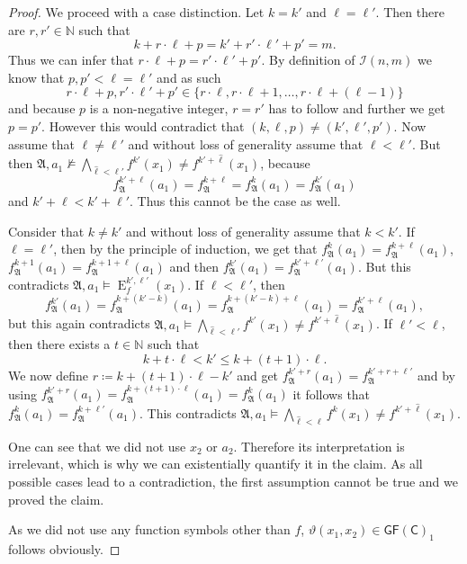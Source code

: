 \documentclass[a4paper,11pt,DIV=15]{scrartcl} %
\theoremstyle{plain}
\theoremstyle{definition}
\newcommand{\GFC}{\mathsf{GF}(\mathsf{C})}
\renewcommand{\theta}{\vartheta}
\begin{document}
\begin{proof}
	We proceed with a case distinction. 
	Let $k=k'$ and $\ell=\ell'$.
	Then there are $r,r'\in\mathbb N$ such that
	$$k+r\cdot \ell + p = k'+r'\cdot \ell' + p'=m.$$
	Thus we can infer that $r\cdot \ell+p = r'\cdot \ell'+p'$.
	By definition of $\mathcal{I}(n,m)$ we know that $p,p'<\ell=\ell'$ and as such 
	$$r\cdot \ell +p,r'\cdot \ell'+p'\in \{r\cdot \ell,r\cdot \ell +1,\dots, r\cdot \ell +(\ell-1)\}$$
	and because $p$ is a non-negative integer, $r=r'$ has to follow and further we get $p=p'$.
	However this would contradict that $(k,\ell,p)\neq (k',\ell',p')$.
	Now assume that $\ell\neq\ell'$ and without loss of generality assume that $\ell<\ell'$.
	But then $\mathfrak A,a_1 \not\models \bigwedge_{\hat{\ell}<\ell'}f^{k'}(x_1)\neq f^{k'+\hat{\ell}}(x_1)$, because 
	$$f^{k'+\ell}_{\mathfrak A}(a_1)=f^{k+\ell}_{\mathfrak A}=f^k_{\mathfrak A}(a_1)=f^{k'}_{\mathfrak A}(a_1)$$
	and $k'+\ell < k'+\ell'$.
	Thus this cannot be the case as well.
	
	Consider that $k\neq k'$ and without loss of generality assume that $k<k'$.
	If $\ell=\ell'$, then by the principle of induction, we get that $f_{\mathfrak A}^k(a_1)=f_{\mathfrak A}^{k+\ell}(a_1)$, $f_{\mathfrak A}^{k+1}(a_1)=f_{\mathfrak A}^{k+1+\ell}(a_1)$ and then $f_{\mathfrak A}^{k'}(a_1)=f_{\mathfrak A}^{k'+\ell'}(a_1)$.
	But this contradicts $\mathfrak A,a_1 \models \operatorname{E}^{k',\ell'}_f(x_1)$.
	If $\ell < \ell'$, then 
	$$f_{\mathfrak A}^{k'}(a_1) =f_{\mathfrak A}^{k+(k'-k)}(a_1)=f_{\mathfrak A}^{k+(k'-k)+\ell}(a_1) = f_{\mathfrak A}^{k'+\ell}(a_1),$$
	but this again contradicts $\mathfrak A,a_1 \models \bigwedge_{\hat{\ell}<\ell'}f^{k'}(x_1)\neq f^{k'+\hat{\ell}}(x_1)$.
	If $\ell'<\ell$, then there exists a $t\in\mathbb N$ such that 
	$$k+t\cdot  \ell < k' \leq k+(t+1)\cdot \ell.$$
	We now define $r\coloneqq k+(t+1)\cdot \ell -k'$ and get $f_{\mathfrak A}^{k'+r}(a_1)=f_{\mathfrak A}^{k'+r+\ell'}$ and by using $f_{\mathfrak A}^{k'+r}(a_1)=f_{\mathfrak A}^{k+(t+1)\cdot \ell}(a_1)=f_{\mathfrak A}^k(a_1)$ it follows that $f_{\mathfrak A}^{k}(a_1)=f_{\mathfrak A}^{k+\ell'}(a_1)$.
	This contradicts $\mathfrak A,a_1 \models \bigwedge_{\hat{\ell}<\ell}f^{k}(x_1)\neq f^{k'+\hat{\ell}}(x_1)$.
	
	One can see that we did not use $x_2$ or $a_2$.
	Therefore its interpretation is irrelevant, which is why we can existentially quantify it in the claim.
	As all possible cases lead to a contradiction, the first assumption cannot be true and we proved the claim.
	
	As we did not use any function symbols other than $f$, $\theta(x_1,x_2)\in \GFC_1$ follows obviously.
\end{proof}
\end{document}

